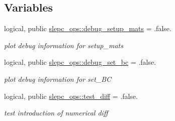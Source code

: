 \subsection*{Variables}
\begin{DoxyCompactItemize}
\item 
logical, public \hyperlink{namespaceslepc__ops_a7b0969e6880eb260176342f464f9420f}{slepc\+\_\+ops\+::debug\+\_\+setup\+\_\+mats} = .false.
\begin{DoxyCompactList}\small\item\em plot debug information for setup\+\_\+mats \end{DoxyCompactList}\item 
logical, public \hyperlink{namespaceslepc__ops_a5150ef703dcabe16a4c84a1ec4f43e57}{slepc\+\_\+ops\+::debug\+\_\+set\+\_\+bc} = .false.
\begin{DoxyCompactList}\small\item\em plot debug information for set\+\_\+\+BC \end{DoxyCompactList}\item 
logical, public \hyperlink{namespaceslepc__ops_acfed4469fcfa4d199eceb4e92aba67ac}{slepc\+\_\+ops\+::test\+\_\+diff} = .false.
\begin{DoxyCompactList}\small\item\em test introduction of numerical diff \end{DoxyCompactList}\end{DoxyCompactItemize}
